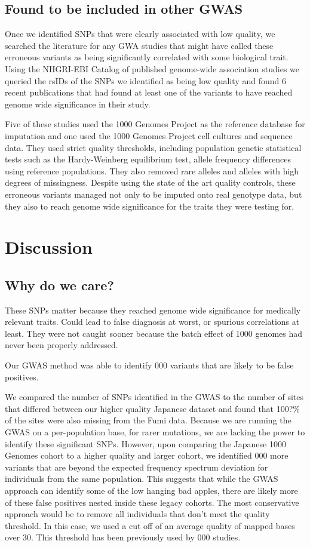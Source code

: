 \documentclass[12pt]{amsart}
\begin{document}
\subsection{Found to be included in other GWAS}
Once we identified SNPs that were clearly associated with low quality, we searched the literature for any GWA studies that might have called these erroneous variants as being significantly correlated with some biological trait. 
Using the NHGRI-EBI Catalog of published genome-wide association studies we queried the rsIDs of the SNPs we identified as being low quality and found 6 recent publications that had found at least one of the variants to have reached genome wide significance in their study. 

Five of these studies used the 1000 Genomes Project as the reference database for imputation and one used the 1000 Genomes Project cell cultures and sequence data. 
They used strict quality thresholds, including population genetic statistical tests such as the Hardy-Weinberg equilibrium test, allele frequency differences using reference populations. 
They also removed rare alleles and alleles with high degrees of missingness. 
Despite using the state of the art quality controls, these erroneous variants managed not only to be imputed onto real genotype data, but they also to reach genome wide significance for the traits they were testing for. 

			\section{Discussion}
\subsection{Why do we care?}
These SNPs matter because they reached genome wide significance for medically relevant traits. 
Could lead to false diagnosis at worst, or spurious correlations at least. 
They were not caught sooner because the batch effect of 1000 genomes had never been properly addressed. 

Our GWAS method was able to identify 000 variants that are likely to be false positives.

We compared the number of SNPs identified in the GWAS to the number of sites that differed between our higher quality Japanese dataset and found that 100?\% of the sites were also missing from the Fumi data. 
Because we are running the GWAS on a per-population base, for rarer mutations, we are lacking the power to identify these significant SNPs.  
However, upon comparing the Japanese 1000 Genomes cohort to a higher quality and larger cohort, we identified 000 more variants that are beyond the expected frequency spectrum deviation for individuals from the same population. 
This suggests that while the GWAS approach can identify some of the low hanging bad apples, there are likely more of these false positives nested inside these legacy cohorts. 
The most conservative approach would be to remove all individuals that don't meet the quality threshold. 
In this case, we used a cut off of an average quality of mapped bases over 30. This threshold has been previously used by 000 studies.
\end{document}
